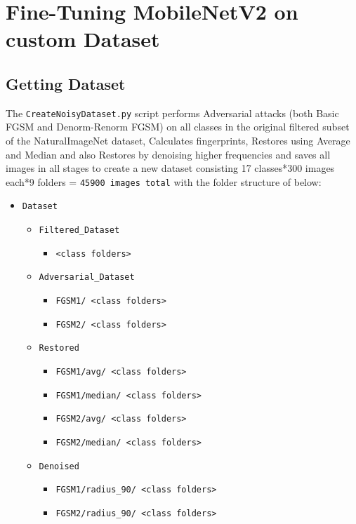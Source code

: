 \documentclass[a4paper,12pt]{report}
\begin{document}
\chapter{Fine-Tuning MobileNetV2 on custom Dataset}
\section{Getting Dataset}
The \texttt{CreateNoisyDataset.py} script performs Adversarial attacks (both Basic FGSM and Denorm-Renorm FGSM) on all classes in the original filtered subset of the NaturalImageNet dataset, Calculates fingerprints, Restores using Average and Median and also Restores by denoising higher frequencies and saves all images in all stages to create a new dataset consisting 17 classes*300 images each*9 folders = \texttt{45900 images total} with the folder structure of below:
\begin{itemize}
    \item \texttt{Dataset}
    \begin{itemize}
        \item \texttt{Filtered\_Dataset}
        \begin{itemize}
            \item \texttt{<class folders>}
        \end{itemize}
        
        \item \texttt{Adversarial\_Dataset}
        \begin{itemize}
            \item \texttt{FGSM1/ <class folders>}
            \item \texttt{FGSM2/ <class folders>}
        \end{itemize}
        
        \item \texttt{Restored}
        \begin{itemize}
            \item \texttt{FGSM1/avg/ <class folders>}
            \item \texttt{FGSM1/median/ <class folders>}
            \item \texttt{FGSM2/avg/ <class folders>}
            \item \texttt{FGSM2/median/ <class folders>}
        \end{itemize}
        
        \item \texttt{Denoised}
        \begin{itemize}
            \item \texttt{FGSM1/radius\_90/ <class folders>}
            \item \texttt{FGSM2/radius\_90/ <class folders>}
        \end{itemize}
    \end{itemize}
\end{itemize}
\end{document}
